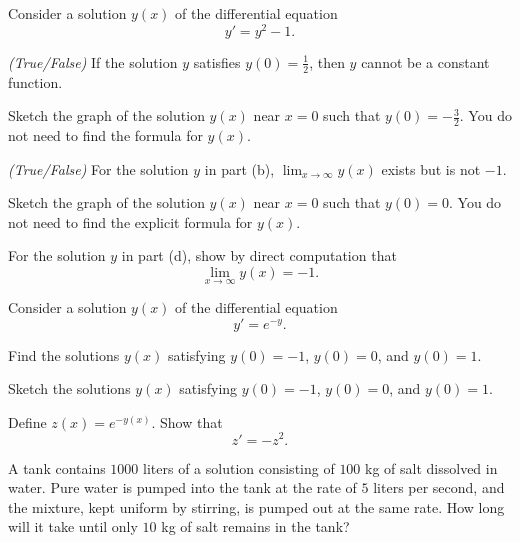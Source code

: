 \documentclass[11pt,oneside]{article}
\begin{document}
\begin{problem}
Consider a solution $y(x)$ of the differential equation
\[
y'=y^2-1.
\]
\begin{problemsubparts}
\item \textit{(True/False)} If the solution $y$ satisfies $y(0)=\frac12$, then $y$ cannot be a constant function.
\item Sketch the graph of the solution $y(x)$ near $x=0$ such that $y(0)=-\frac32$. You do not need to find the formula for $y(x)$.
\item \textit{(True/False)} For the solution $y$ in part (b), $\lim_{x\to\infty}y(x)$ exists but is not $-1$.
\item Sketch the graph of the solution $y(x)$ near $x=0$ such that $y(0)=0$. You do not need to find the explicit formula for $y(x)$.
\item For the solution $y$ in part (d), show by direct computation that
\[
\lim_{x\to\infty}y(x)=-1.
\]
\end{problemsubparts}
\end{problem}

\begin{problem}
Consider a solution $y(x)$ of the differential equation
\[
y'=e^{-y}.
\]
\begin{problemsubparts}
\item Find the solutions $y(x)$ satisfying $y(0)=-1$, $y(0)=0$, and $y(0)=1$.
\item Sketch the solutions $y(x)$ satisfying $y(0)=-1$, $y(0)=0$, and $y(0)=1$.
\item Define $z(x)=e^{-y(x)}$. Show that
\[
z'=-z^2.
\]
\end{problemsubparts}
\end{problem}

\begin{problem}
A tank contains $1000$ liters of a solution consisting of $100$ kg of salt dissolved in water. Pure water is pumped into the tank at the rate of $5$ liters per second, and the mixture, kept uniform by stirring, is pumped out at the same rate. How long will it take until only $10$ kg of salt remains in the tank?
\end{problem}
\end{document}
